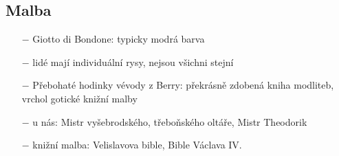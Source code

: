 \documentclass{article}
\begin{document}
\subsection*{Malba}
\begin{itemize}
    \vspace{-0.5em}
    \setlength\itemsep{0.15em}
    \item[$-$] Giotto di Bondone: typicky modrá barva
    \item[$-$] lidé mají individuální rysy, nejsou všichni stejní
    \item[$-$] Přebohaté hodinky vévody z Berry: překrásně zdobená kniha modliteb, vrchol gotické knižní malby
    \item[$-$] u nás: Mistr vyšebrodského, třeboňského oltáře, Mistr Theodorik
    \item[$-$] knižní malba: Velislavova bible, Bible Václava IV.
\end{itemize}
\end{document}
